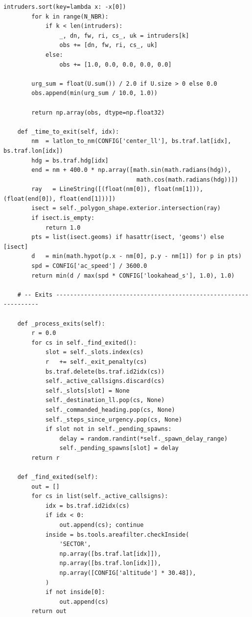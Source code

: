 \documentclass[10pt, a4paper]{article}
\begin{document}
\begin{lstlisting}[caption={v3\_simple\_env.py --- ATCO conflict-resolution environment}, label=lst:env]
        intruders.sort(key=lambda x: -x[0])
        for k in range(N_NBR):
            if k < len(intruders):
                _, dn, fw, ri, cs_, uk = intruders[k]
                obs += [dn, fw, ri, cs_, uk]
            else:
                obs += [1.0, 0.0, 0.0, 0.0, 0.0]

        urg_sum = float(U.sum()) / 2.0 if U.size > 0 else 0.0
        obs.append(min(urg_sum / 10.0, 1.0))

        return np.array(obs, dtype=np.float32)

    def _time_to_exit(self, idx):
        nm  = latlon_to_nm(CONFIG['center_ll'], bs.traf.lat[idx], bs.traf.lon[idx])
        hdg = bs.traf.hdg[idx]
        end = nm + 400.0 * np.array([math.sin(math.radians(hdg)),
                                      math.cos(math.radians(hdg))])
        ray   = LineString([(float(nm[0]), float(nm[1])), (float(end[0]), float(end[1]))])
        isect = self._polygon_shape.exterior.intersection(ray)
        if isect.is_empty:
            return 1.0
        pts = list(isect.geoms) if hasattr(isect, 'geoms') else [isect]
        d   = min(math.hypot(p.x - nm[0], p.y - nm[1]) for p in pts)
        spd = CONFIG['ac_speed'] / 3600.0
        return min(d / max(spd * CONFIG['lookahead_s'], 1.0), 1.0)

    # -- Exits -----------------------------------------------------------------

    def _process_exits(self):
        r = 0.0
        for cs in self._find_exited():
            slot = self._slots.index(cs)
            r   += self._exit_penalty(cs)
            bs.traf.delete(bs.traf.id2idx(cs))
            self._active_callsigns.discard(cs)
            self._slots[slot] = None
            self._destination_ll.pop(cs, None)
            self._commanded_heading.pop(cs, None)
            self._steps_since_urgency.pop(cs, None)
            if slot not in self._pending_spawns:
                delay = random.randint(*self._spawn_delay_range)
                self._pending_spawns[slot] = delay
        return r

    def _find_exited(self):
        out = []
        for cs in list(self._active_callsigns):
            idx = bs.traf.id2idx(cs)
            if idx < 0:
                out.append(cs); continue
            inside = bs.tools.areafilter.checkInside(
                'SECTOR',
                np.array([bs.traf.lat[idx]]),
                np.array([bs.traf.lon[idx]]),
                np.array([CONFIG['altitude'] * 30.48]),
            )
            if not inside[0]:
                out.append(cs)
        return out


\end{lstlisting}
\end{document}
